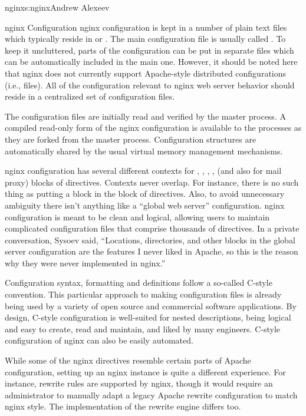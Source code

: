 \begin{aosachapter}{nginx}{s:nginx}{Andrew Alexeev}
\begin{aosasect1}{nginx Configuration}
nginx configuration is kept in a number of plain text files which
typically reside in  or
. The main configuration file is usually called
. To keep it uncluttered, parts of the configuration
can be put in separate files which can be automatically included in
the main one. However, it should be noted here that nginx does not
currently support Apache-style distributed configurations (i.e.,
 files). All of the configuration relevant to nginx
web server behavior should reside in a centralized set of
configuration files.

The configuration files are initially read and verified by the master
process. A compiled read-only form of the nginx configuration is
available to the  processes as they are forked from the
master process. Configuration structures are automatically shared by
the usual virtual memory management mechanisms.

nginx configuration has several different contexts for ,
, , ,  (and also
 for mail proxy) blocks of directives. Contexts never
overlap. For instance, there is no such thing as putting a
 block in the  block of directives. Also, to
avoid unnecessary ambiguity there isn't anything like a ``global web
server'' configuration. nginx configuration is meant to be clean and
logical, allowing users to maintain complicated configuration files
that comprise thousands of directives. In a private conversation, 
Sysoev said, 
``Locations, directories, and other blocks in the global server
configuration are the features I never liked in Apache, so this is the
reason why they were never implemented in nginx.''

Configuration syntax, formatting and definitions follow a so-called
C-style convention. This particular approach to making configuration
files is already being used by a variety of open source and
commercial software applications. By design, C-style configuration is well-suited 
for nested descriptions, being logical and easy to create, read
and maintain, and liked by many engineers. C-style configuration of
nginx can also be easily automated.

While some of the nginx directives resemble certain parts of Apache
configuration, setting up an nginx instance is quite a different
experience. For instance, rewrite rules are supported by nginx, though
it would require an administrator to manually adapt a legacy Apache
rewrite configuration to match nginx style. The implementation of the
rewrite engine differs too.


\end{aosasect1}
\end{aosachapter}
